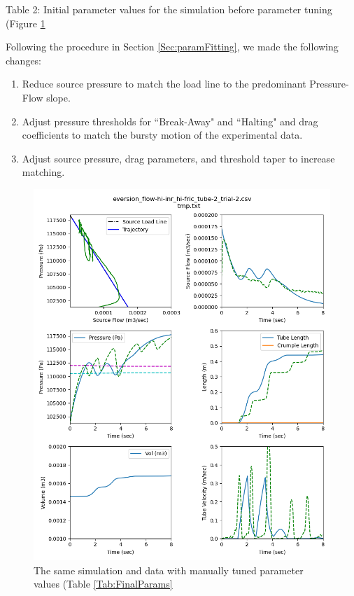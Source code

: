 \documentclass[letterpaper]{article}
\begin{document}
Table 2: Initial parameter values for the simulation before parameter tuning (Figure
\ref{Fig:InitialSimCompare}

Following the procedure in Section \ref{Sec:paramFitting}, we made the following
changes:

\begin{enumerate}
    \item Reduce source pressure to match the load line to the predominant Pressure-Flow slope.
    \item  Adjust pressure thresholds for ``Break-Away" and ``Halting" and
    drag coefficients to match the
    bursty motion of the experimental data.
    \item  Adjust source pressure, drag parameters, and threshold taper to
    increase matching.
\end{enumerate}


\begin{figure}\centering
\includegraphics[width=.75\textwidth]{Set6wFinalParms.png}
\caption{The same simulation and data with manually tuned parameter values (Table \ref{Tab:FinalParams}}
\label{Fig:InitialSimCompare}
\end{figure}
\end{document}
